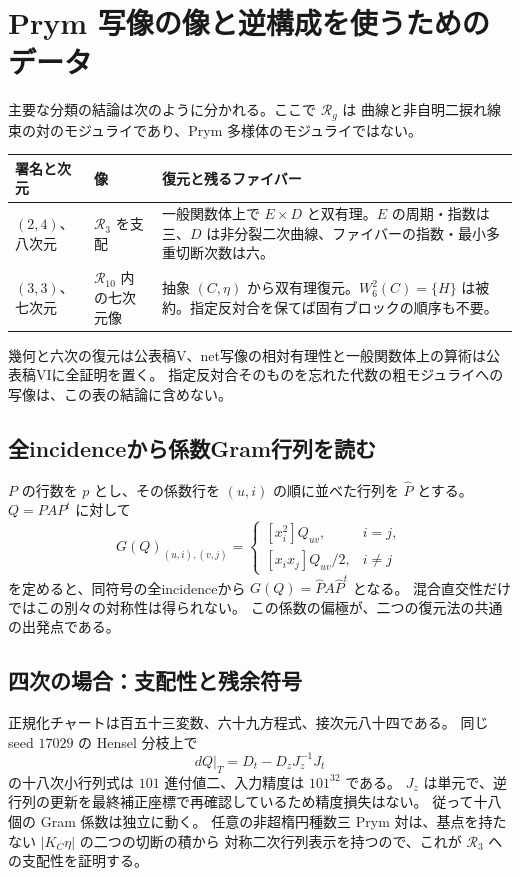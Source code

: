\section{Prym 写像の像と逆構成を使うためのデータ}
\label{sec:notes-prym-v27}

主要な分類の結論は次のように分かれる。ここで $\mathcal R_g$ は
曲線と非自明二捩れ線束の対のモジュライであり、Prym 多様体のモジュライではない。
\begin{center}\small
\begin{tabular}{p{.15\linewidth}p{.20\linewidth}p{.53\linewidth}}\toprule
署名と次元&像&復元と残るファイバー\\\midrule
$(2,4)$、八次元&$\mathcal R_3$ を支配&一般関数体上で $E\times D$ と双有理。$E$ の周期・指数は三、$D$ は非分裂二次曲線、ファイバーの指数・最小多重切断次数は六。\\
$(3,3)$、七次元&$\mathcal R_{10}$ 内の七次元像&抽象 $(C,\eta)$ から双有理復元。$W_6^2(C)=\{H\}$ は被約。指定反対合を保てば固有ブロックの順序も不要。\\\bottomrule
\end{tabular}\end{center}
幾何と六次の復元は公表稿V、net写像の相対有理性と一般関数体上の算術は公表稿VIに全証明を置く。
指定反対合そのものを忘れた代数の粗モジュライへの写像は、この表の結論に含めない。

\subsection{全incidenceから係数Gram行列を読む}
$P$ の行数を $p$ とし、その係数行を $(u,i)$ の順に並べた行列を $\widehat P$ とする。
$Q=PAP^t$ に対して
\[
 G(Q)_{(u,i),(v,j)}=
 \begin{cases}\left[x_i^2\right]Q_{uv},&i=j,\\
 \left[x_ix_j\right]Q_{uv}/2,&i\ne j\end{cases}
\]
を定めると、同符号の全incidenceから
$G(Q)=\widehat P A\widehat P^t$ となる。
混合直交性だけではこの別々の対称性は得られない。
この係数の偏極が、二つの復元法の共通の出発点である。

\subsection{四次の場合：支配性と残余符号}
正規化チャートは百五十三変数、六十九方程式、接次元八十四である。
同じ seed $17029$ の Hensel 分枝上で
\[
 dQ|_{T}=D_t-D_zJ_z^{-1}J_t
\]
の十八次小行列式は $101$ 進付値二、入力精度は $101^{32}$ である。
$J_z$ は単元で、逆行列の更新を最終補正座標で再確認しているため精度損失はない。
従って十八個の Gram 係数は独立に動く。
任意の非超楕円種数三 Prym 対は、基点を持たない $|K_C\eta|$ の二つの切断の積から
対称二次行列表示を持つので、これが $\mathcal R_3$ への支配性を証明する。

